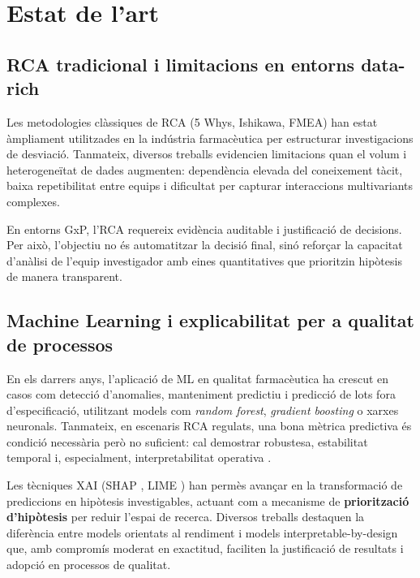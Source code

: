 \section{Estat de l'art}

\subsection{RCA tradicional i limitacions en entorns data-rich}

Les metodologies clàssiques de RCA (5 Whys, Ishikawa, FMEA) han estat àmpliament utilitzades en la indústria farmacèutica per estructurar investigacions de desviació. Tanmateix, diversos treballs evidencien limitacions quan el volum i heterogeneïtat de dades augmenten: dependència elevada del coneixement tàcit, baixa repetibilitat entre equips i dificultat per capturar interaccions multivariants complexes.

En entorns GxP, l'RCA requereix evidència auditable i justificació de decisions. Per això, l'objectiu no és automatitzar la decisió final, sinó reforçar la capacitat d'anàlisi de l'equip investigador amb eines quantitatives que prioritzin hipòtesis de manera transparent.

\subsection{Machine Learning i explicabilitat per a qualitat de processos}

En els darrers anys, l'aplicació de ML en qualitat farmacèutica ha crescut en casos com detecció d'anomalies, manteniment predictiu i predicció de lots fora d'especificació, utilitzant models com \emph{random forest}, \emph{gradient boosting} \cite{xgboost} o xarxes neuronals. Tanmateix, en escenaris RCA regulats, una bona mètrica predictiva és condició necessària però no suficient: cal demostrar robustesa, estabilitat temporal i, especialment, interpretabilitat operativa \cite{doshi2017rigorous,rudin2021fundamental}.

Les tècniques XAI (SHAP \cite{shap_arxiv1705}, LIME \cite{lime_arxiv1602}) han permès avançar en la transformació de prediccions en hipòtesis investigables, actuant com a mecanisme de \textbf{priorització d'hipòtesis} per reduir l'espai de recerca. Diversos treballs destaquen la diferència entre models orientats al rendiment i models interpretable-by-design que, amb compromís moderat en exactitud, faciliten la justificació de resultats i adopció en processos de qualitat.

